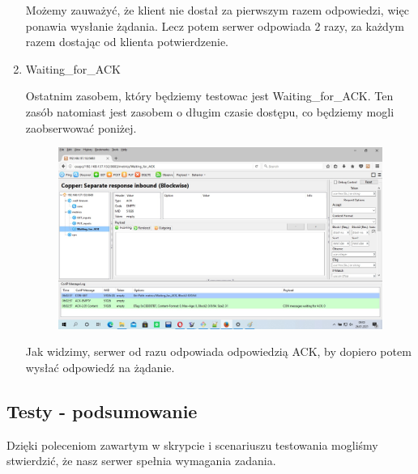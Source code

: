 \begin{enumerate}
Możemy zauważyć, że klient nie dostał za pierwszym razem odpowiedzi, więc ponawia wysłanie żądania. Lecz potem serwer odpowiada 2 razy, za każdym razem dostając od klienta potwierdzenie.

\item Waiting\_for\_ACK

Ostatnim zasobem, który będziemy testowac jest Waiting\_for\_ACK. Ten zasób natomiast jest zasobem o długim czasie dostępu, co będziemy mogli zaobserwować poniżej.

\begin{figure}[h]
    \includegraphics[scale=0.4]{img/met_ack.jpg}
\end{figure}
\vspace{0.5cm}

Jak widzimy, serwer od razu odpowiada odpowiedzią ACK, by dopiero potem wysłać odpowiedź na żądanie.
\end{enumerate}

\subsection {Testy - podsumowanie}

Dzięki poleceniom zawartym w skrypcie i scenariuszu testowania mogliśmy stwierdzić, że nasz serwer spełnia wymagania zadania.